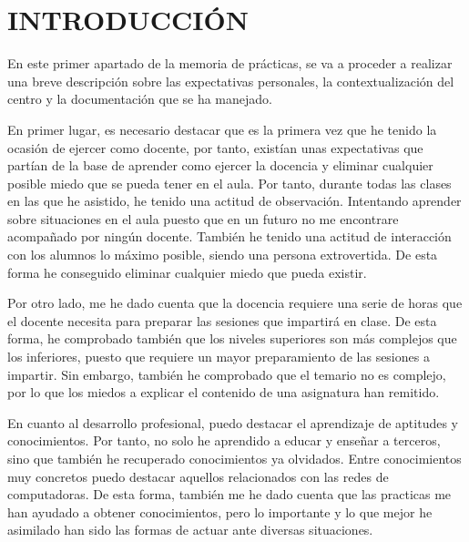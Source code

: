 \documentclass[spanish,12pt, a4paper,twoside]{paper}
\let\oldsection\section
\def\section{\cleardoublepage\oldsection}
\newcommand\blankpage{%
\null
\thispagestyle{empty}%
\addtocounter{page}{-1}%
\newpage}
\begin{document}


\afterpage{\blankpage}
\setlength{\parskip}{8pt}

\tableofcontents %


\newpage
{} 



\section{INTRODUCCIÓN} %

En este primer apartado de la memoria de prácticas, se va a proceder a realizar una breve descripción sobre las expectativas personales, la contextualización del centro y la documentación que se ha manejado.

En primer lugar, es necesario destacar que es la primera vez que he tenido la ocasión de ejercer como docente, por tanto, existían unas expectativas que partían de la base de aprender como ejercer la docencia y eliminar cualquier posible miedo que se pueda tener en el aula. Por tanto, durante todas las clases en las que he asistido, he tenido una actitud de observación. Intentando aprender sobre situaciones en el aula puesto que en un futuro no me encontrare acompañado por ningún docente. También he tenido una actitud de interacción con los alumnos lo máximo posible, siendo una persona extrovertida. De esta forma he conseguido eliminar cualquier miedo que pueda existir.

Por otro lado, me he dado cuenta que la docencia requiere una serie de horas que el docente necesita para preparar las sesiones que impartirá en clase. De esta forma, he comprobado también que los niveles superiores son más complejos que los inferiores, puesto que requiere un mayor preparamiento de las sesiones a impartir. Sin embargo, también he comprobado que el temario no es complejo, por lo que los miedos a explicar el contenido de una asignatura han remitido.

En cuanto al desarrollo profesional, puedo destacar el aprendizaje de aptitudes y conocimientos. Por tanto, no solo he aprendido a educar y enseñar a terceros, sino que también he recuperado conocimientos ya olvidados. Entre conocimientos muy concretos puedo destacar aquellos relacionados con las redes de computadoras. De esta forma, también me he dado cuenta que las practicas me han ayudado a obtener conocimientos, pero lo importante y lo que mejor he asimilado han sido las formas de actuar ante diversas situaciones.
\end{document}
